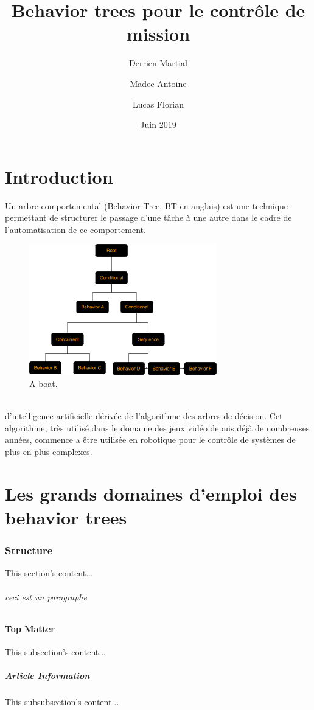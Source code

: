 \documentclass[titlepage]{article}
\title{Behavior trees pour le contr\^ole de mission}
\author{
	Derrien Martial \\
	\and
	Madec Antoine \\
	\and
	Lucas Florian
}
\date{Juin 2019}
\begin{document}
	\maketitle
	\tableofcontents
	\hypersetup{linktocpage}
	
	\clearpage
	\part{Introduction}
	Un arbre comportemental (Behavior Tree, BT en anglais) est une
	technique permettant de structurer le passage d'une tâche à une autre dans 
	le cadre de l'automatisation de ce comportement. \cite{colledanchise_ogren_2018}
	\\
	\begin{figure}[h!]
		\includegraphics[width=\linewidth]{img/behavior_trees_example.png}
		\caption{A boat.}
		\label{fig:boat1}
	\end{figure}
	\\
	d’intelligence artificielle dérivée de l’algorithme des arbres
	de décision. \cite{rasmussen}
	Cet algorithme, très utilisé dans le domaine des jeux
	vidéo depuis déjà de nombreuses années, commence a être utilisée en
	robotique pour le contrôle de systèmes de plus en plus complexes.
	
	\clearpage
	\part{Les grands domaines d'emploi des behavior trees}
	\section{Structure}
	This section's content...
	\paragraph{ceci est un paragraphe}	
	\subsection{Top Matter}
	This subsection's content...
	\subsubsection{Article Information}
	This subsubsection's content...
	
	\clearpage
	
	
	
\end{document}
